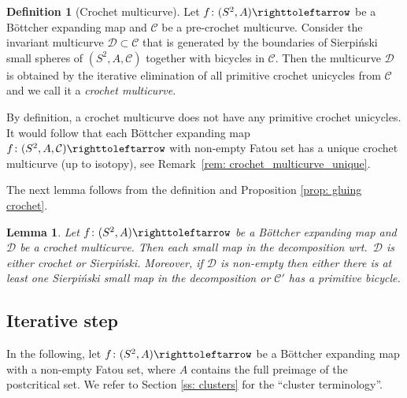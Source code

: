 \documentclass{amsart}
\theoremstyle{plain}
\newtheorem{lemma}[theorem]{Lemma}
\theoremstyle{definition}
\newtheorem{definition}[theorem]{Definition}
\theoremstyle{remark}
\newcommand{\reminder}[1]{\textsl{$\lhd\rhd$#1$\lhd\rhd$}\marginpar{$\lhd\rhd\lhd\rhd\lhd\rhd$}}%
\newcommand{\hide}[1]{}
\newcommand{\CC}{{\mathcal C}}
\newcommand{\DD}{{\mathcal D}}
\newcommand{\PC}{{\mathcal P}}
\newcommand\selfmap{\righttoleftarrow}
\begin{document}
\begin{definition}[Crochet multicurve]
\label{def:croch mult}
Let $f\colon (S^2, A)\selfmap$ be a B\"{o}ttcher expanding map and $\CC$ be a pre-crochet multicurve. Consider the invariant multicurve $\DD\subset \CC$ that is generated by the boundaries of Sierpi\'{n}ski small spheres of $(S^2,A,\CC)$ together with bicycles in $\CC$. 
Then the multicurve $\DD$ is obtained by the iterative elimination of all primitive crochet unicycles from $\CC$ and we call it a \emph{crochet multicurve}.

\end{definition}

By definition, a crochet multicurve does not have any primitive crochet unicycles. It would follow that each B\"{o}ttcher expanding map $f\colon (S^2, A, \CC)\selfmap$ with non-empty Fatou set has a unique crochet multicurve (up to isotopy), see Remark~\ref{rem: crochet_multicurve_unique}.


The next lemma follows from the definition and Proposition \ref{prop: gluing crochet}.

\begin{lemma}\label{lem:cro-mult-decomp}
Let $f\colon (S^2,A)\selfmap$ be a B\"{o}ttcher expanding map and $\DD$ be a crochet multicurve. Then each small map in the decomposition wrt.\ $\DD$ is either crochet or Sierpi\'{n}ski. Moreover, if $\DD$ is non-empty then either there is at least one Sierpi\'{n}ski small map in the decomposition or $\CC'$ has a primitive bicycle. 
\end{lemma}







\subsection{Iterative step} 

In the following,  let $f\colon (S^2,A)\selfmap$ be a B\"ottcher expanding map with a non-empty Fatou set, where $A$ contains the full preimage of the postcritical set. We refer to Section \ref{ss: clusters} for the ``cluster terminology''.

\end{document}
